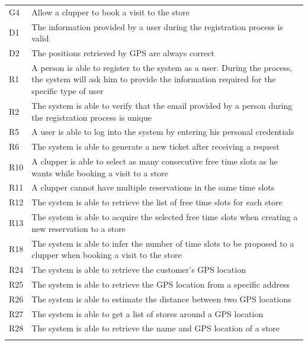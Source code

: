 \begin{longtable}[]{@{}
  >{\raggedright\arraybackslash}p{}
  >{\raggedright\arraybackslash}p{}@{}}
\toprule
G4 & Allow a clupper to book a visit to the store \\ \addlinespace
\midrule
\endhead
D1 & The information provided by a user during the registration process
is valid \\ \addlinespace
D2 & The positions retrieved by GPS are always correct \\ \addlinespace
R1 & A person is able to register to the system as a user. During the
process, the system will ask him to provide the information required for
the specific type of user \\ \addlinespace
R2 & The system is able to verify that the email provided by a person
during the registration process is unique \\ \addlinespace
R5 & A user is able to log into the system by entering his personal
credentials \\ \addlinespace
R6 & The system is able to generate a new ticket after receiving a
request \\ \addlinespace
R10 & A clupper is able to select as many consecutive free time slots as
he wants while booking a visit to a store \\ \addlinespace
R11 & A clupper cannot have multiple reservations in the same time
slots \\ \addlinespace
R12 & The system is able to retrieve the list of free time slots for
each store \\ \addlinespace
R13 & The system is able to acquire the selected free time slots when
creating a new reservation to a store \\ \addlinespace
R18 & The system is able to infer the number of time slots to be
proposed to a clupper when booking a visit to the store \\ \addlinespace
R24 & The system is able to retrieve the customer's GPS
location \\ \addlinespace
R25 & The system is able to retrieve the GPS location from a specific
address \\ \addlinespace
R26 & The system is able to estimate the distance between two GPS
locations \\ \addlinespace
R27 & The system is able to get a list of stores around a GPS
location \\ \addlinespace
R28 & The system is able to retrieve the name and GPS location of a
store \\ \addlinespace
\bottomrule
\end{longtable}

